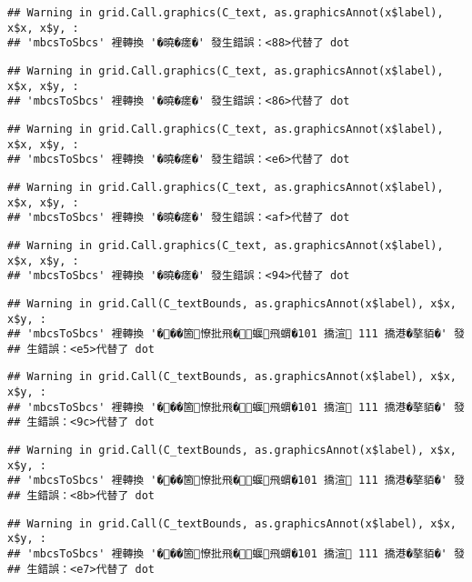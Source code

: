 \documentclass[
]{article}
\begin{document}
\begin{verbatim}
## Warning in grid.Call.graphics(C_text, as.graphicsAnnot(x$label), x$x, x$y, :
## 'mbcsToSbcs' 裡轉換 '�曉�瘥�' 發生錯誤：<88>代替了 dot
\end{verbatim}

\begin{verbatim}
## Warning in grid.Call.graphics(C_text, as.graphicsAnnot(x$label), x$x, x$y, :
## 'mbcsToSbcs' 裡轉換 '�曉�瘥�' 發生錯誤：<86>代替了 dot
\end{verbatim}

\begin{verbatim}
## Warning in grid.Call.graphics(C_text, as.graphicsAnnot(x$label), x$x, x$y, :
## 'mbcsToSbcs' 裡轉換 '�曉�瘥�' 發生錯誤：<e6>代替了 dot
\end{verbatim}

\begin{verbatim}
## Warning in grid.Call.graphics(C_text, as.graphicsAnnot(x$label), x$x, x$y, :
## 'mbcsToSbcs' 裡轉換 '�曉�瘥�' 發生錯誤：<af>代替了 dot
\end{verbatim}

\begin{verbatim}
## Warning in grid.Call.graphics(C_text, as.graphicsAnnot(x$label), x$x, x$y, :
## 'mbcsToSbcs' 裡轉換 '�曉�瘥�' 發生錯誤：<94>代替了 dot
\end{verbatim}

\begin{verbatim}
## Warning in grid.Call(C_textBounds, as.graphicsAnnot(x$label), x$x, x$y, :
## 'mbcsToSbcs' 裡轉換 '���箇憭批飛�蝘飛蝟�101 撟渲 111 撟港�摮貊�' 發
## 生錯誤：<e5>代替了 dot
\end{verbatim}

\begin{verbatim}
## Warning in grid.Call(C_textBounds, as.graphicsAnnot(x$label), x$x, x$y, :
## 'mbcsToSbcs' 裡轉換 '���箇憭批飛�蝘飛蝟�101 撟渲 111 撟港�摮貊�' 發
## 生錯誤：<9c>代替了 dot
\end{verbatim}

\begin{verbatim}
## Warning in grid.Call(C_textBounds, as.graphicsAnnot(x$label), x$x, x$y, :
## 'mbcsToSbcs' 裡轉換 '���箇憭批飛�蝘飛蝟�101 撟渲 111 撟港�摮貊�' 發
## 生錯誤：<8b>代替了 dot
\end{verbatim}

\begin{verbatim}
## Warning in grid.Call(C_textBounds, as.graphicsAnnot(x$label), x$x, x$y, :
## 'mbcsToSbcs' 裡轉換 '���箇憭批飛�蝘飛蝟�101 撟渲 111 撟港�摮貊�' 發
## 生錯誤：<e7>代替了 dot
\end{verbatim}
\end{document}
